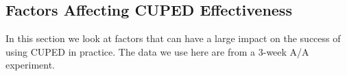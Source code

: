 \documentclass{sig-alternate}
\begin{document}
%
%

\subsection{Factors Affecting CUPED Effectiveness}
In this section we look at factors that can have a large impact on the success of using CUPED in practice. The data we use here are from a 3-week A/A experiment. 
\end{document}
